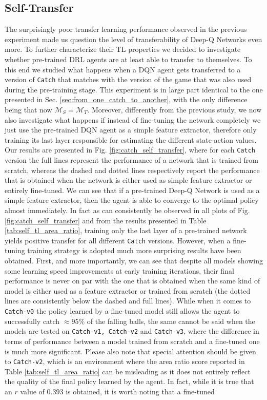 \subsection{Self-Transfer}
\label{sec:self_transfer}

The surprisingly poor transfer learning performance observed in the previous experiment made us question the level of transferability of Deep-Q Networks even more. To further characterize their TL properties we decided to investigate whether pre-trained DRL agents are at least able to transfer to themselves. To this end we studied what happens when a DQN agent gets transferred to a version of \texttt{Catch} that matches with the version of the game that was also used during the pre-training stage. This experiment is in large part identical to the one presented in Sec. \ref{sec:from_one_catch_to_another}, with the only difference being that now $\mathcal{M}_S = \mathcal{M}_T$. Moreover, differently from the previous study, we now also investigate what happens if instead of fine-tuning the network completely we just use the pre-trained DQN agent as a simple feature extractor, therefore only training its last layer responsible for estimating the different state-action values. Our results are presented in Fig. \ref{fig:catch_self_transfer}, where for each \texttt{Catch} version the full lines represent the performance of a network that is trained from scratch, whereas the dashed and dotted lines respectively report the performance that is obtained when the network is either used as simple feature extractor or entirely fine-tuned. We can see that if a pre-trained Deep-Q Network is used as a simple feature extractor, then the agent is able to converge to the optimal policy almost immediately. In fact as can consistently be observed in all plots of Fig. \ref{fig:catch_self_transfer} and from the results presented in Table \ref{tab:self_tl_area_ratio}, training only the last layer of a pre-trained network yields positive transfer for all different \texttt{Catch} versions. However, when a fine-tuning training strategy is adopted much more surprising results have been obtained. First, and more importantly, we can see that despite all models showing some learning speed improvements at early training iterations, their final performance is never on par with the one that is obtained when the same kind of model is either used as a feature extractor or trained from scratch (the dotted lines are consistently below the dashed and full lines). While when it comes to \texttt{Catch-v0} the policy learned by a fine-tuned model still allows the agent to successfully catch $\approx 95\%$ of the falling balls, the same cannot be said when the models are tested on \texttt{Catch-v1, Catch-v2} and \texttt{Catch-v3}, where the difference in terms of performance between a model trained from scratch and a fine-tuned one is much more significant. Please also note that special attention should be given to \texttt{Catch-v2}, which is an environment where the area ratio score reported in Table \ref{tab:self_tl_area_ratio} can be misleading as it does not entirely reflect the quality of the final policy learned by the agent. In fact, while it is true that an $r$ value of $0.393$ is obtained, it is worth noting that a fine-tuned 